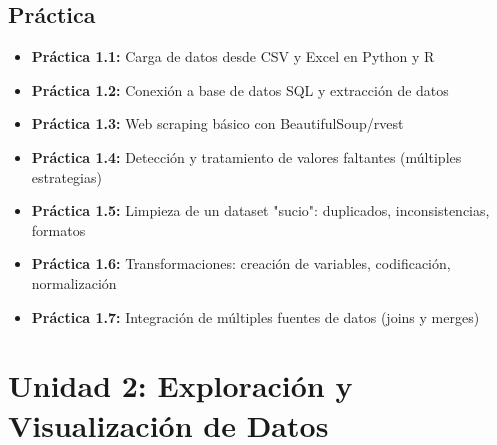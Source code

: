 \documentclass[a4paper,11pt]{article}
\begin{document}
\subsection{Práctica}
\begin{itemize}[leftmargin=*, labelindent=0pt, label={\textcolor{practicacolor}{$\blacktriangleright$}}]
    \item \textbf{Práctica 1.1:} Carga de datos desde CSV y Excel en Python y R
    \item \textbf{Práctica 1.2:} Conexión a base de datos SQL y extracción de datos
    \item \textbf{Práctica 1.3:} Web scraping básico con BeautifulSoup/rvest
    \item \textbf{Práctica 1.4:} Detección y tratamiento de valores faltantes (múltiples estrategias)
    \item \textbf{Práctica 1.5:} Limpieza de un dataset "sucio": duplicados, inconsistencias, formatos
    \item \textbf{Práctica 1.6:} Transformaciones: creación de variables, codificación, normalización
    \item \textbf{Práctica 1.7:} Integración de múltiples fuentes de datos (joins y merges)
\end{itemize}

\section{Unidad 2: Exploración y Visualización de Datos}
\end{document}
